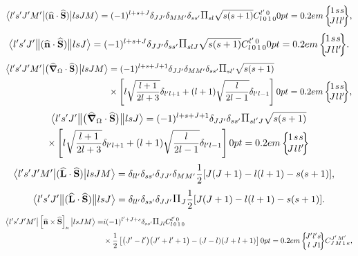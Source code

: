 \begin{equation}
\braOket{ l^{\prime} s^{\prime} J^{\prime} M^{\prime}}{(\widehat{\vect{n}} \cdot \widehat{\vect{S}})}{l s J M}=(-1)^{l+s+J} \delta_{J J^{\prime}} \delta_{M M^{\prime}} \delta_{s s^{\prime}} \Fact{s l}\sqrt{s(s+1)}
\clebsch{l}{0}{1}{0}{l^{\prime}}{0}
\sixj{1}{s}{s}{J}{l}{l^{\prime}}, \label{eq:13:2:166}
\end{equation}
\begin{equation*}
\braOketred{ l^{\prime} s^{\prime} J^{\prime}}{(\widehat{\vect{n}} \cdot \widehat{\vect{S}})}{l s J}=(-1)^{l+s+J} \delta_{J J^{\prime}} \delta_{s s^{\prime}} \Fact{s l J}\sqrt{s(s+1)}
\clebsch{l}{0}{1}{0}{l^{\prime}}{0}
\sixj{1}{s}{s}{J}{l}{l^{\prime}}.
\end{equation*}
\begin{align}
\braOket{ l^{\prime} s^{\prime} J^{\prime} M^{\prime}}{\bigl(\delop_{\Omega} \cdot \widehat{\vect{S}}\bigr)}{l s J M}&=(-1)^{l+s+J+1} \delta_{J J^{\prime}} \delta_{M M^{\prime}} \delta_{s s^{\prime}} \Fact{s l^\prime}\sqrt{s(s+1)} \notag\\
& \times\left[l \sqrt{\frac{l+1}{2 l+3}} \delta_{l^{\prime} l+1}+(l+1) \sqrt{\frac{l}{2 l-1}} \delta_{l^{\prime} l-1}\right]
\sixj{1}{s}{s}{J}{l}{l^{\prime}},  \label{eq:13:2:167}
\end{align}
\begin{multline*}
\braOketred{ l^{\prime} s^{\prime} J^{\prime}}{\bigl(\delop_{\Omega} \cdot \widehat{\vect{S}}\bigr)}{l s J}=(-1)^{l+s+J+1} \delta_{J J^{\prime}} \delta_{s s^{\prime}} \Fact{s l^\prime J}\sqrt{s(s+1)} \\
\times\left[l \sqrt{\frac{l+1}{2 l+3}} \delta_{l^{\prime} l+1}+(l+1) \sqrt{\frac{l}{2 l-1}} \delta_{l^{\prime} l-1}\right]
\sixj{1}{s}{s}{J}{l}{l^{\prime}}
\end{multline*}\begin{align}
& 
\bigl\langle  l^{\prime} s^{\prime} J^{\prime} M^{\prime} \big| (\widehat{\mathbf{L}} \cdot \widehat{\mathbf{S}}) \big| l s J M \bigr\rangle=\delta_{l l^{\prime}} \delta_{s s^{\prime}} \delta_{J J^{\prime}} \delta_{M M^{\prime}} \frac{1}{2}[J(J+1)-l(l+1)-s(s+1)],  \label{eq:13:2:168}
\end{align}
\begin{equation*}
\braOketred{ l^{\prime} s^{\prime} J^{\prime}}{(\widehat{\vect{L}} \cdot \widehat{\vect{S}})}{l s J}=\delta_{l l^{\prime}} \delta_{s s^{\prime}} \delta_{J J^{\prime}} \Fact{J} \frac{1}{2}[J(J+1)-l(l+1)-s(s+1)].
\end{equation*}
\begin{align}
\braOket{l^{\prime} s^{\prime} J^{\prime} M^{\prime}}%
{\left[\widehat{\vect{n}} \times\widehat{\vect{S}}\right]_{\kappa}}%
{l s J M} 
=&i(-1)^{l^{\prime}+J+s} \delta_{ss'} \Fact{J l} 
\clebsch{l}{0}{1}{0}{l^{\prime}}{0} \notag\\
& \times \frac{1}{2}\left[\bigl(J^{\prime}-l^{\prime}\bigr)\bigl(J^{\prime}+l^{\prime}+1\bigr)-(J-l)(J+l+1)\right]
\sixj{J^{\prime}}{l^{\prime}}{s}{l}{J}{1}
\clebsch{J}{M}{1}{\kappa}{J^{\prime}}{M^{\prime}},  \label{eq:13:2:169}
\end{align}
